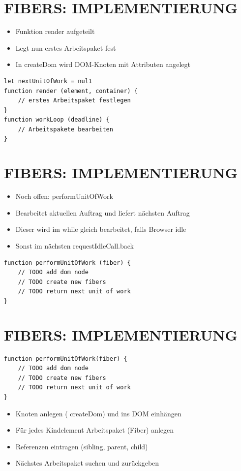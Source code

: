 \documentclass[10pt]{article}
\begin{document}
\section*{FIBERS: IMPLEMENTIERUNG}
\begin{itemize}
  \item Funktion render aufgeteilt
  \item Legt nun erstes Arbeitspaket fest
  \item In createDom wird DOM-Knoten mit Attributen angelegt
\end{itemize}

\begin{verbatim}
let nextUnitOfWork = nul1
function render (element, container) {
    // erstes Arbeitspaket festlegen
}
function workLoop (deadline) {
    // Arbeitspakete bearbeiten
}
\end{verbatim}

\section*{FIBERS: IMPLEMENTIERUNG}
\begin{itemize}
  \item Noch offen: performUnitOfWork
  \item Bearbeitet aktuellen Auftrag und liefert nächsten Auftrag
  \item Dieser wird im while gleich bearbeitet, falls Browser idle
  \item Sonst im nächsten requestIdleCall.back
\end{itemize}

\begin{verbatim}
function performUnitOfWork (fiber) {
    // TODO add dom node
    // TODO create new fibers
    // TODO return next unit of work
}
\end{verbatim}

\section*{FIBERS: IMPLEMENTIERUNG}
\begin{verbatim}
function performUnitOfWork(fiber) {
    // TODO add dom node
    // TODO create new fibers
    // TODO return next unit of work
}
\end{verbatim}

\begin{itemize}
  \item Knoten anlegen ( createDom) und ins DOM einhängen
  \item Für jedes Kindelement Arbeitspaket (Fiber) anlegen
  \item Referenzen eintragen (sibling, parent, child)
  \item Nächstes Arbeitspaket suchen und zurückgeben
\end{itemize}
\end{document}
